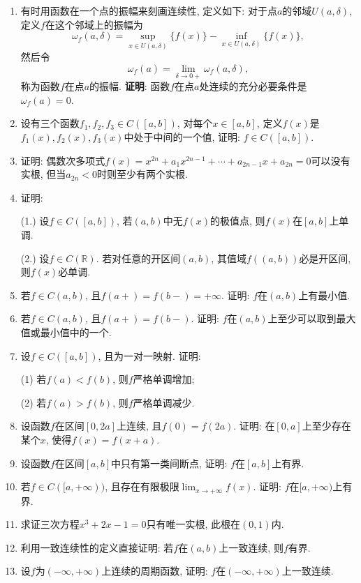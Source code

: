 \documentclass[UTF8,11pt, a4paper, oneside, fontset=none]{ctexbook}
\begin{document}
\begin{enumerate}

\item 有时用函数在一个点的振幅来刻画连续性, 定义如下: 对于点$a$的邻域$U(a, \delta)$, 定义$f$在这个邻域上的振幅为
\[
\omega_f(a, \delta) = \sup_{x \in U(a, \delta)}\{ f(x)\} - \inf_{x \in U(a, \delta)}\{ f(x)\},
\]
然后令
\[
\omega_f(a) = \lim_{\delta \to 0+} \omega_f(a, \delta),
\]
称为函数$f$在点$a$的振幅. {\bf 证明}: 函数$f$在点$a$处连续的充分必要条件是$\omega_f(a) =0$.
 

\item 设有三个函数$f_1, f_2, f_3 \in C([a, b])$, 对每个$x \in [a, b]$, 定义$f(x)$是$f_1(x), f_2(x), f_3(x)$中处于中间的一个值, 证明: $f \in C([a, b])$.

\item 证明: 偶数次多项式$f(x) = x^{2n} + a_1 x^{2n-1} + \cdots + a_{2n-1} x + a_{2n} = 0$可以没有实根, 但当$a_{2n}<0$时则至少有两个实根.

\item 证明:

(1.) 设$f \in C([a, b])$, 若$(a, b)$中无$f(x)$的极值点, 则$f(x)$在$[a, b]$上单调.

(2.) 设$f \in C(\mathbb R)$. 若对任意的开区间$(a, b)$, 其值域$f((a, b))$必是开区间, 则$f(x)$必单调.

\item 若$f \in C(a, b)$, 且$f(a+) = f(b-) = +\infty$. 证明: $f$在$(a, b)$上有最小值.

\item 若$f \in C(a, b)$, 且$f(a+) = f(b-)$. 证明: $f$在$(a, b)$上至少可以取到最大值或最小值中的一个.

\item 设$f \in C([a, b])$, 且为一对一映射. 证明:

(1) 若$f(a)<f(b)$, 则$f$严格单调增加;

(2) 若$f(a)>f(b)$, 则$f$严格单调减少.
\item 设函数$f$在区间$[0, 2a]$上连续, 且$f(0) = f(2a)$. 证明: 在$[0, a]$上至少存在某个$x$, 使得$f(x) = f(x+a)$.

\item 设函数$f$在区间$[a, b]$中只有第一类间断点, 证明: $f$在$[a, b]$上有界.

\item 若$f \in C([a, +\infty))$, 且存在有限极限$\lim_{x \to +\infty}f(x)$. 证明: $f$在$[a, +\infty)$上有界.


\item 求证三次方程$x^3 + 2x -1=0$只有唯一实根, 此根在$(0, 1)$内.

\item 利用一致连续性的定义直接证明: 若$f$在$(a, b)$上一致连续, 则$f$有界.
\item 设$f$为$(-\infty, +\infty)$上连续的周期函数, 证明: $f$在$(-\infty, +\infty)$上一致连续.

\end{enumerate}
\end{document}
